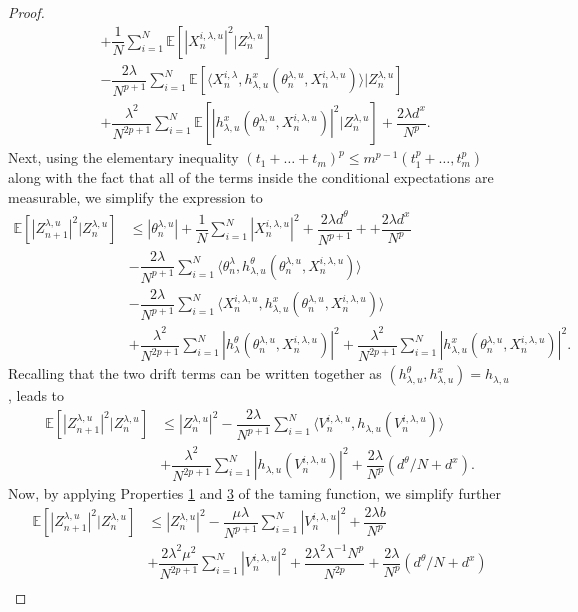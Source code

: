 \documentclass[a4paper, 10pt]{article}
\theoremstyle{plain}%
\begin{document}
\begin{proof}
\begin{align*}
&+\dfrac{1}{N}\sum_{i=1}^N\mathbb{E}\left[\left|X_{n}^{i,\lambda,u}\right|^2|Z_{n}^{\lambda,u}\right]\nonumber\\
&-\dfrac{2\lambda}{N^{p+1}}\sum_{i=1}^N\mathbb{E}\left[\langle X_n^{i,\lambda},h_{\lambda,u}^{x}(\theta_{n}^{\lambda,u},X_{n}^{i,\lambda,u})\rangle|Z_{n}^{\lambda,u}\right]\\
&+\dfrac{\lambda^2}{N^{2p+1}}\sum_{i=1}^N\mathbb{E}\left[|h_{\lambda,u}^x(\theta_{n}^{\lambda,u},X_{n}^{i,\lambda,u})|^2|Z_{n}^{\lambda,u}\right]+\dfrac{2\lambda d^x}{N^p}.
\end{align*}
Next, using the elementary inequality $(t_1+\ldots+t_m)^p\leq m^{p-1}(t_1^p+\ldots,t_m^p)$ along with the fact that all of the terms inside the conditional expectations are measurable, we simplify the expression to
\begin{align*}
\mathbb{E}\left[\left|Z_{n+1}^{\lambda,u}\right|^2|Z_{n}^{\lambda,u}\right]&\leq |\theta_{n}^{\lambda,u}|+\dfrac{1}{N}\sum_{i=1}^N|X_n^{i,\lambda,u}|^2+\dfrac{2\lambda d^{\theta}}{N^{p+1}}++\dfrac{2\lambda d^x}{N^p}\\&-\dfrac{2\lambda}{N^{p+1}}\sum_{i=1}^N\langle \theta_n^{\lambda},h_{\lambda,u}^{\theta}(\theta_{n}^{\lambda,u},X_{n}^{i,\lambda,u})\rangle\\
&-\dfrac{2\lambda}{N^{p+1}}\sum_{i=1}^N\langle X_n^{i,\lambda,u},h_{\lambda,u}^{x}(\theta_{n}^{\lambda,u},X_{n}^{i,\lambda,u}) \rangle \\&+\dfrac{\lambda^2}{N^{2p+1}}\sum_{i=1}^N|h_\lambda^{\theta}(\theta_{n}^{\lambda,u},X_{n}^{i,\lambda,u})|^2 +\dfrac{\lambda^2}{N^{2p+1}}\sum_{i=1}^N|h_{\lambda,u}^{x}(\theta_{n}^{\lambda,u},X_{n}^{i,\lambda,u})|^2.
\end{align*}
Recalling that the two drift terms can be written together as $(h^{\theta}_{\lambda,u},h^x_{\lambda,u})=h_{\lambda,u}$, leads to
\begin{align*}
\mathbb{E}\left[\left|Z_{n+1}^{\lambda,u}\right|^2|Z_{n}^{\lambda,u}\right]&\leq \left|Z_{n}^{\lambda,u}\right|^2-\dfrac{2\lambda}{N^{p+1}}\sum_{i=1}^N\langle V_n^{i,\lambda,u},h_{\lambda,u}(V_{n}^{i,\lambda,u})\rangle\\
&+\dfrac{\lambda^2}{N^{2p+1}}\sum_{i=1}^N|h_{\lambda,u}(V_{n}^{i,\lambda,u})|^2+\dfrac{2\lambda}{N^{p}}(d^{\theta}/N+d^x).
\end{align*}
Now, by applying Properties \hyperlink{Property1}{1} and \hyperlink{Property3}{3} of the taming function, we simplify further
\begin{align*}
\mathbb{E}\left[\left|Z_{n+1}^{\lambda,u}\right|^2|Z_{n}^{\lambda,u}\right]&\leq \left|Z_{n}^{\lambda,u}\right|^2-\dfrac{\mu\lambda}{N^{p+1}}\sum_{i=1}^N\left|V_{n}^{i,\lambda,u}\right|^2+\dfrac{2\lambda b}{N^{p}}\\&+\dfrac{2\lambda^2\mu^2}{N^{2p+1}}\sum_{i=1}^N \left|V_{n}^{i,\lambda,u}\right|^2+\dfrac{2\lambda^2\lambda^{-1}N^{p}}{N^{2p}}+\dfrac{2\lambda}{N^{p}}(d^{\theta}/N+d^x)\\

\end{align*}
\end{proof}
\end{document}
